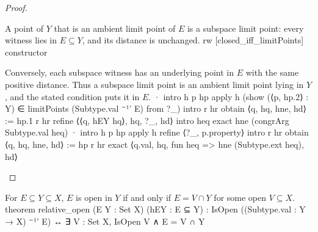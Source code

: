 \begin{proof}
  \begin{lean}{A point of $Y$ that is an ambient limit point of $E$ is a subspace limit point: every witness lies in $E\subseteq Y$, and its distance is unchanged.}
    rw [closed_iff_limitPoints]
    constructor
  \end{lean}

  \begin{lean}{Conversely, each subspace witness has an underlying point in $E$ with the same positive distance. Thus a subspace limit point is an ambient limit point lying in $Y$, and the stated condition puts it in $E$.}
    · intro h p hp
      apply h (show (⟨p, hp.2⟩ : Y) ∈ limitPoints (Subtype.val ⁻¹' E) from ?_)
      intro r hr
      obtain ⟨q, hq, hne, hd⟩ := hp.1 r hr
      refine ⟨⟨q, hEY hq⟩, hq, ?_, hd⟩
      intro heq
      exact hne (congrArg Subtype.val heq)
    · intro h p hp
      apply h
      refine ⟨?_, p.property⟩
      intro r hr
      obtain ⟨q, hq, hne, hd⟩ := hp r hr
      exact ⟨q.val, hq, fun heq => hne (Subtype.ext heq), hd⟩
  \end{lean}

\end{proof}

\begin{proposition} \label{an1:thm:open-set-relative-to-subspace}
  \begin{lean}{For $E\subseteq Y\subseteq X$, $E$ is open in $Y$ if and only if $E=V\cap Y$ for some open $V\subseteq X$.}
    theorem relative_open (E Y : Set X) (hEY : E ⊆ Y) :
        IsOpen ((Subtype.val : Y → X) ⁻¹' E) ↔
          ∃ V : Set X, IsOpen V ∧ E = V ∩ Y
  \end{lean}
\end{proposition}

